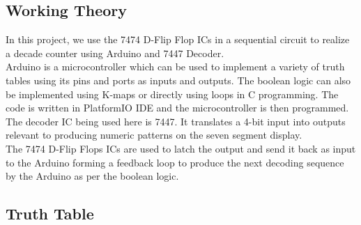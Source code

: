 \documentclass[journal,10pt]{article}
\begin{document}
\subsection{Working Theory}
In this project, we use the 7474 D-Flip Flop ICs in a sequential circuit to realize a decade counter using Arduino and 7447 Decoder.\vspace{4pt}\\
Arduino is a microcontroller which can be used to implement a variety of truth tables using its pins and ports as inputs and outputs. The boolean logic can also be implemented using K-maps or directly using loops in C programming. The code is written in PlatformIO IDE and the microcontroller is then programmed.\vspace{4pt}\\
The decoder IC being used here is 7447. It translates a 4-bit input into outputs relevant to producing numeric patterns on the seven segment display.\vspace{4pt}\\
The 7474 D-Flip Flops ICs are used to latch the output and send it back as input to the Arduino forming a feedback loop to produce the next decoding sequence by the Arduino as per the boolean logic.\\

\subsection{Truth Table}
\end{document}
